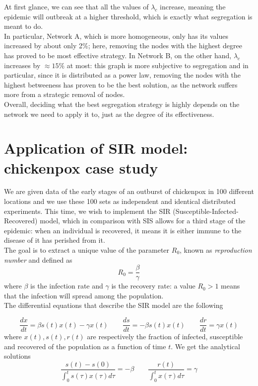 \documentclass[a4paper,11pt]{article}
\begin{document}
At first glance, we can see that all the values of $\lambda_c$ increase, meaning the epidemic will outbreak at a higher threshold, which is exactly what segregation is meant to do. 
\\
In particular, Network A, which is more homogeneous, only has its values increased by about only 2\%; here, removing the nodes with the highest degree has proved to be most effective strategy. In Network B, on the other hand, $\lambda_c$ increases by $\approx 15\%$ at most: this graph is more subjective to segregation and in particular, since it is distributed as a power law, removing the nodes with the highest betweeness has proven to be the best solution, as the network suffers more from a strategic removal of nodes.
\\
Overall, deciding what the best segregation strategy is highly depends on the network we need to apply it to, just as the degree of its effectiveness.


\section{Application of SIR model: chickenpox case study}
We are given data of the early stages of an outburst of chickenpox in 100 different locations and we use these 100 sets as independent and identical distributed experiments. This time, we wish to implement the SIR (Susceptible-Infected-Recovered) model, which in comparison with SIS allows for a third stage of the epidemic: when an individual is recovered, it means it is either immune to the disease of it has perished from it.
\\
The goal is to extract a unique value of the parameter $R_0$, known as \emph{reproduction number} and defined as 
\begin{equation}
    R_0 = \frac{\beta}{\gamma}
\end{equation}
where $\beta$ is the infection rate and $\gamma$ is the recovery rate: a value $R_0 > 1$ means that the infection will spread among the population. 
\\
The differential equations that describe the SIR model are the following

\begin{equation}
    \frac{dx}{dt}=\beta s(t) x(t) -\gamma x(t) \qquad 
    \frac{ds}{dt}=-\beta s(t) x(t) \qquad
    \frac{dr}{dt}=\gamma x(t)
\end{equation}
where $x(t),s(t),r(t)$ are respectively the fraction of infected, susceptible and recovered of the population as a function of time $t$.
We get the analytical solutions 
\begin{equation}
    \frac{s(t)-s(0)}{\int_{0}^{t} s(\tau) x(\tau) d\tau}=-\beta \qquad \frac{r(t)}{\int_{0}^{t} x(\tau)d\tau}=\gamma
\end{equation}
\end{document}
